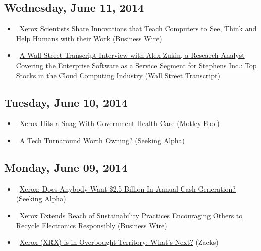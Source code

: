 \documentclass[11pt,asymmetric]{article}
\begin{document}
\subsection*{Wednesday, June 11, 2014}
\begin{itemize}
\item\ \href{http://finance.yahoo.com/news/xerox-scientists-share-innovations-teach-140000312.html}{Xerox Scientists Share Innovations that Teach Computers to See, Think and Help Humans with their Work} (Business Wire)
\item\ \href{http://finance.yahoo.com/news/wall-street-transcript-interview-alex-131200507.html}{A Wall Street Transcript Interview with Alex Zukin, a Research Analyst Covering the Enterprise Software as a Service Segment for Stephens Inc.: Top Stocks in the Cloud Computing Industry} (Wall Street Transcript)
\end{itemize}
\subsection*{Tuesday, June 10, 2014}
\begin{itemize}
\item\ \href{http://www.fool.com/investing/general/2014/06/10/is-it-time-to-take-another-look-at-xerox.aspx?source=eogyholnk0000001}{Xerox Hits a Snag With Government Health Care} (Motley Fool)
\item\ \href{http://seekingalpha.com/article/2261013-a-tech-turnaround-worth-owning?source=yahoo}{A Tech Turnaround Worth Owning?} (Seeking Alpha)
\end{itemize}
\subsection*{Monday, June 09, 2014}
\begin{itemize}
\item\ \href{http://seekingalpha.com/article/2260173-xerox-does-anybody-want-2_5-billion-in-annual-cash-generation?source=yahoo}{Xerox: Does Anybody Want \$2.5 Billion In Annual Cash Generation?} (Seeking Alpha)
\item\ \href{http://finance.yahoo.com/news/xerox-extends-reach-sustainability-practices-150500754.html}{Xerox Extends Reach of Sustainability Practices Encouraging Others to Recycle Electronics Responsibly} (Business Wire)
\item\ \href{http://finance.yahoo.com/news/xerox-xrx-overbought-territory-whats-134846302.html}{Xerox (XRX) is in Overbought Territory: What's Next?} (Zacks)
\end{itemize}
\end{document}
